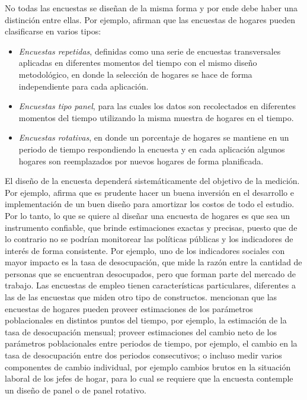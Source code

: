 \documentclass[
  10pt,
  spanish,
]{book}
\providecommand{\tightlist}{%
  \setlength{\itemsep}{0pt}\setlength{\parskip}{0pt}}
\begin{document}
No todas las encuestas se diseñan de la misma forma y por ende debe haber una distinción entre ellas. Por ejemplo, \citet{Kalton_Citro_1993} afirman que las encuestas de hogares pueden clasificarse en varios tipos:

\begin{itemize}
\tightlist
\item
  \emph{Encuestas repetidas}, definidas como una serie de encuestas transversales aplicadas en diferentes momentos del tiempo con el mismo diseño metodológico, en donde la selección de hogares se hace de forma independiente para cada aplicación.
\item
  \emph{Encuestas tipo panel}, para las cuales los datos son recolectados en diferentes momentos del tiempo utilizando la misma muestra de hogares en el tiempo.
\item
  \emph{Encuestas rotativas}, en donde un porcentaje de hogares se mantiene en un periodo de tiempo respondiendo la encuesta y en cada aplicación algunos hogares son reemplazados por nuevos hogares de forma planificada.
\end{itemize}

El diseño de la encuesta dependerá sistemáticamente del objetivo de la medición. Por ejemplo, \citet{Kalton_2009} afirma que es prudente hacer un buena inversión en el desarrollo e implementación de un buen diseño para amortizar los costos de todo el estudio. Por lo tanto, lo que se quiere al diseñar una encuesta de hogares es que sea un instrumento confiable, que brinde estimaciones exactas y precisas, puesto que de lo contrario no se podrían monitorear las políticas públicas y los indicadores de interés de forma consistente. Por ejemplo, uno de los indicadores sociales con mayor impacto es la tasa de desocupación, que mide la razón entre la cantidad de personas que se encuentran desocupados, pero que forman parte del mercado de trabajo. Las encuestas de empleo tienen características particulares, diferentes a las de las encuestas que miden otro tipo de constructos. \citet{Duncan_Kalton_1987} mencionan que las encuestas de hogares pueden proveer estimaciones de los parámetros poblacionales en distintos puntos del tiempo, por ejemplo, la estimación de la tasa de desocupación mensual; proveer estimaciones del cambio neto de los parámetros poblacionales entre periodos de tiempo, por ejemplo, el cambio en la tasa de desocupación entre dos periodos consecutivos; o incluso medir varios componentes de cambio individual, por ejemplo cambios brutos en la situación laboral de los jefes de hogar, para lo cual se requiere que la encuesta contemple un diseño de panel o de panel rotativo.
\end{document}
